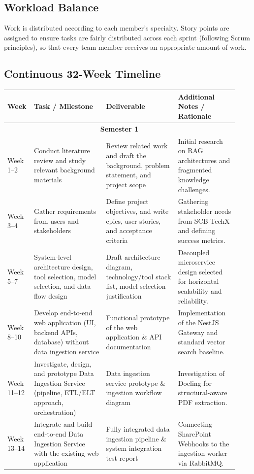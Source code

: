 \documentclass[12pt]{article}
\begin{document}
\subsection{Workload Balance}
Work is distributed according to each member's specialty. Story points are assigned to ensure tasks are fairly distributed across each sprint (following Scrum principles), so that every team member receives an appropriate amount of work.

\subsection{Continuous 32-Week Timeline}

\begin{longtable}{p{0.08\linewidth} p{0.30\linewidth} p{0.30\linewidth} p{0.25\linewidth}}
\toprule
\textbf{Week} & \textbf{Task / Milestone} & \textbf{Deliverable} & \textbf{Additional Notes / Rationale} \\
\midrule
\endhead
\multicolumn{4}{c}{\textbf{Semester 1}} \\
\midrule
Week 1--2 & Conduct literature review and study relevant background materials & Review related work and draft the background, problem statement, and project scope & Initial research on RAG architectures and fragmented knowledge challenges. \\
Week 3--4 & Gather requirements from users and stakeholders & Define project objectives, and write epics, user stories, and acceptance criteria & Gathering stakeholder needs from SCB TechX and defining success metrics. \\
Week 5--7 & System-level architecture design, tool selection, model selection, and data flow design & Draft architecture diagram, technology/tool stack list, model selection justification & Decoupled microservice design selected for horizontal scalability and reliability. \\
Week 8--10 & Develop end-to-end web application (UI, backend APIs, database) without data ingestion service & Functional prototype of the web application \& API documentation & Implementation of the NestJS Gateway and standard vector search baseline. \\
Week 11--12 & Investigate, design, and prototype Data Ingestion Service (pipeline, ETL/ELT approach, orchestration) & Data ingestion service prototype \& ingestion workflow diagram & Investigation of Docling for structural-aware PDF extraction. \\
Week 13--14 & Integrate and build end-to-end Data Ingestion Service with the existing web application & Fully integrated data ingestion pipeline \& system integration test report & Connecting SharePoint Webhooks to the ingestion worker via RabbitMQ. \\

\end{longtable}
\end{document}
